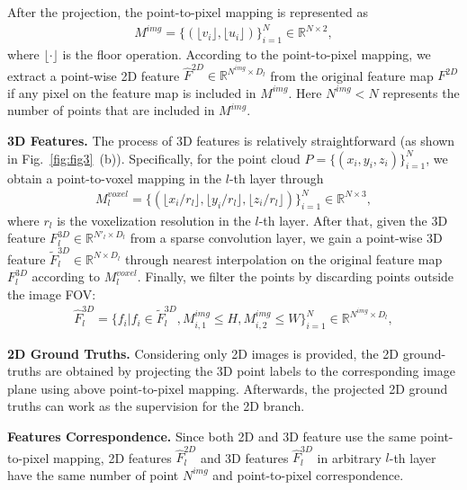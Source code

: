 \documentclass[runningheads]{llncs}
\begin{document}
After the projection, the point-to-pixel mapping is represented as 
	\begin{align}
	M^{img} = \{(\lfloor  v_i\rfloor , \lfloor  u_i \rfloor )\}_{i=1}^N  \in \mathbb{R}^{N\times 2},
	\label{map_img}
	\end{align}
	where $\lfloor \cdot \rfloor$ is the floor operation.
According to the point-to-pixel mapping, we extract a point-wise 2D feature $\hat{F}^{2D} \in \mathbb{R}^{N^{img}\times D_l}$ from the original feature map ${F}^{2D}$ if any pixel on the feature map is included in $M^{img}$.
Here $N^{img} < N$ represents the number of points that are included in $M^{img}$.
	
	\noindent\textbf{3D Features.}
	The process of 3D features is relatively straightforward (as shown in Fig.~\ref{fig:fig3}~(b)).
Specifically, for the point cloud $P = \{(x_i, y_i, z_i)\}_{i=1}^N$, we obtain a point-to-voxel mapping in the $l$-th layer through  
	\begin{align}
	M^{voxel}_l = \{(\lfloor  x_i/r_l \rfloor , \lfloor  y_i/r_l \rfloor, \lfloor  z_i/r_l \rfloor )\}_{i=1}^N  \in \mathbb{R}^{N\times 3},
	\label{map_voxel}
	\end{align}
	where $r_l$ is the voxelization resolution in the $l$-th layer.
After that, given the 3D feature ${F}^{3D}_l \in \mathbb{R}^{N'_l\times D_l}$ from a sparse convolution layer, we gain a point-wise 3D feature $\tilde{F}^{3D}_l \in \mathbb{R}^{N\times D_l}$ through nearest interpolation on the original feature map ${F}^{3D}_l$ according to $M^{voxel}_l$.
Finally, we filter the points by discarding points outside the image FOV:
	\begin{align}
	\hat{F}^{3D}_l = \{f_i | f_i \in \tilde{F}^{3D}_l, M_{i,1}^{img} \leq H, M_{i,2}^{img} \leq W\}_{i=1}^N  \in \mathbb{R}^{N^{img}\times D_l},
	\label{keep_img}
	\end{align}
	
	
	
	\noindent\textbf{2D Ground Truths.} Considering only 2D images is provided, the 2D ground-truths are obtained by projecting the 3D point labels to the corresponding image plane using above point-to-pixel mapping.
Afterwards, the projected 2D ground truths can work as the supervision for the 2D branch. 

	
	\noindent\textbf{Features Correspondence.}
	Since both 2D and 3D feature use the same point-to-pixel mapping, 2D features $\hat{F}^{2D}_l$ and 3D features $\hat{F}^{3D}_l$ in arbitrary $l$-th layer have the same number of point $N^{img}$ and point-to-pixel correspondence.
	
\end{document}
